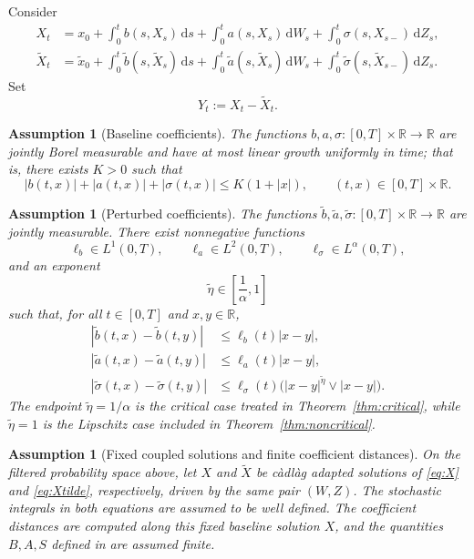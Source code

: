 \documentclass[11pt]{article}
\newtheorem{assumption}[theorem]{Assumption}
\newcommand{\R}{\mathbb{R}}
\newcommand{\1}{\mathbf{1}}
\newcommand{\dd}{\,\mathrm{d}}
\newcommand{\wt}{\tilde}
\begin{document}
Consider
\begin{align}
X_t
&=x_0+\int_0^t b(s,X_s)\dd s+\int_0^t a(s,X_s)\dd W_s
 +\int_0^t \sigma(s,X_{s-})\dd Z_s, \label{eq:X}\\
\wt X_t
&=\wt x_0+\int_0^t \wt b(s,\wt X_s)\dd s+\int_0^t \wt a(s,\wt X_s)\dd W_s
 +\int_0^t \wt\sigma(s,\wt X_{s-})\dd Z_s. \label{eq:Xtilde}
\end{align}
Set
\[
  Y_t:=X_t-\wt X_t.
\]

\begin{assumption}[Baseline coefficients]\label{ass:baseline}
The functions $b,a,\sigma:[0,T]\times\R\to\R$ are jointly Borel measurable and have at most linear growth uniformly in time; that is, there exists $K>0$ such that
\[
  |b(t,x)|+|a(t,x)|+|\sigma(t,x)|\le K(1+|x|),
  \qquad (t,x)\in[0,T]\times\R.
\]
\end{assumption}

\begin{assumption}[Perturbed coefficients]\label{ass:perturbed}
The functions $\wt b,\wt a,\wt\sigma:[0,T]\times\R\to\R$ are jointly measurable. There exist nonnegative functions
\[
  \ell_b\in L^1(0,T),\qquad \ell_a\in L^2(0,T),\qquad \ell_\sigma\in L^\alpha(0,T),
\]
and an exponent
\[
  \wt\eta\in\left[\frac1\alpha,1\right]
\]
such that, for all $t\in[0,T]$ and $x,y\in\R$,
\begin{align}
  |\wt b(t,x)-\wt b(t,y)|&\le \ell_b(t)|x-y|, \label{eq:b-lip}\\
  |\wt a(t,x)-\wt a(t,y)|&\le \ell_a(t)|x-y|, \label{eq:a-lip}\\
  |\wt\sigma(t,x)-\wt\sigma(t,y)|&\le \ell_\sigma(t)\bigl(|x-y|^{\wt\eta}\vee |x-y|\bigr). \label{eq:sigma-holder}
\end{align}
The endpoint $\wt\eta=1/\alpha$ is the critical case treated in Theorem~\ref{thm:critical}, while $\wt\eta=1$ is the Lipschitz case included in Theorem~\ref{thm:noncritical}.
\end{assumption}


\begin{assumption}[Fixed coupled solutions and finite coefficient distances]
\label{ass:solutions}
On the filtered probability space above, let $X$ and $\wt X$ be c\`adl\`ag adapted solutions of \eqref{eq:X} and \eqref{eq:Xtilde}, respectively, driven by the same pair $(W,Z)$. The stochastic integrals in both equations are assumed to be well defined. The coefficient distances are computed along this fixed baseline solution $X$, and the quantities $B,A,S$ defined in  are assumed finite.
\end{assumption}
\end{document}
